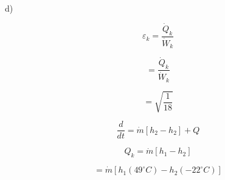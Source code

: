 d)

\[
\varepsilon_k = \frac{\dot{Q}_k}{\dot{W}_k}
\]

\[
= \frac{\dot{Q}_k}{\dot{W}_k}
\]

\[
= \sqrt{\frac{1}{18}}
\]

\[
\frac{d}{dt} = \dot{m} \left[ h_2 - h_2 \right] + Q
\]

\[
Q_k = \dot{m} \left[ h_1 - h_2 \right]
\]

\[
= \dot{m} \left[ h_1 (49^\circ C) - h_2 (-22^\circ C) \right]
\]